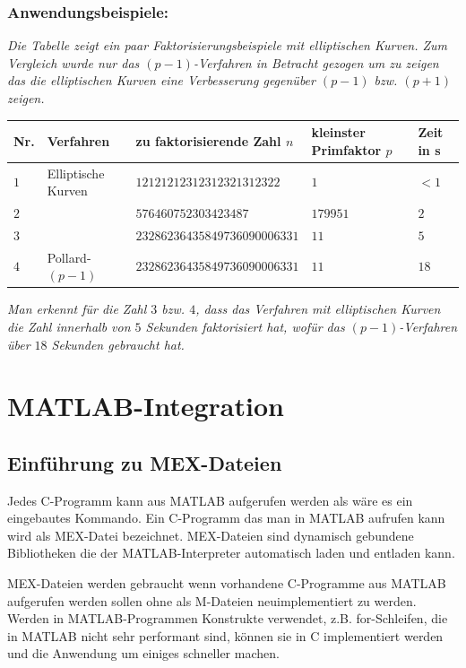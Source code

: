 \documentclass[a4paper,11pt]{article}
\begin{document}
\subsubsection*{Anwendungsbeispiele:}
{\it
Die Tabelle zeigt ein paar Faktorisierungsbeispiele mit elliptischen Kurven.
Zum Vergleich wurde nur das $(p-1)$-Verfahren in Betracht gezogen um zu 
zeigen das die elliptischen Kurven eine Verbesserung gegenüber $(p-1)$ bzw.
$(p+1)$ zeigen.
}
\begin{center}
\begin{tabular}{|l|l|l|l|l|}
\hline
Nr. & Verfahren & zu faktorisierende Zahl $n$ & kleinster Primfaktor $p$ & Zeit in s\\
\hline
$1$& Elliptische Kurven & $12121212312312321312322$ & $1$ & $<1$\\
\hline
$2$&	& $576460752303423487$ & $179951$ & $2$\\
\hline
$3$&	& $23286236435849736090006331$ & $11$ & $5$\\
\hline
$4$& Pollard-$(p-1)$	& $23286236435849736090006331$ & $11$ & $18$\\
\hline
\end{tabular}
\end{center}
{\it
Man erkennt für die Zahl $3$ bzw. $4$, dass das Verfahren mit elliptischen 
Kurven die Zahl innerhalb von $5$ Sekunden faktorisiert hat, wofür das
$(p-1)$-Verfahren über $18$ Sekunden gebraucht hat. 
}



\newpage

\section{MATLAB-Integration}
\subsection{Einführung zu MEX-Dateien}
Jedes C-Programm kann aus MATLAB aufgerufen werden als wäre es
ein eingebautes Kommando. Ein C-Programm das man in MATLAB
aufrufen kann wird als MEX-Datei bezeichnet. MEX-Dateien sind
dynamisch gebundene Bibliotheken die der MATLAB-Interpreter
automatisch laden und entladen kann.

MEX-Dateien werden gebraucht wenn vorhandene C-Programme aus MATLAB
aufgerufen werden sollen ohne als M-Dateien neuimplementiert zu
werden. Werden in MATLAB-Programmen Konstrukte verwendet, z.B.
for-Schleifen, die in MATLAB nicht sehr performant sind, können sie in
C implementiert werden und die Anwendung um einiges schneller machen.
\end{document}
